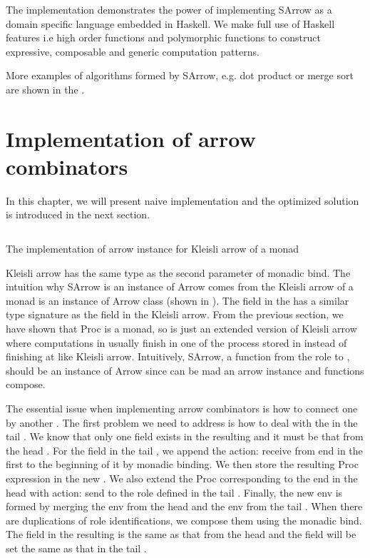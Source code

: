 The implementation demonstrates the power of implementing SArrow as a domain specific language embedded in Haskell. We make full use of Haskell features i.e high order functions and polymorphic functions to construct expressive, composable and \linebreak generic computation patterns.

More examples of algorithms formed by SArrow, e.g. dot product or merge sort are shown in the .
\section{Implementation of arrow combinators} \label{SArrow:impl}
In this chapter, we will present naive implementation and the optimized solution is introduced in the next section.

\begin{listing}[ht]
    \inputminted{Haskell}{arrow/kleisli.hs} 
    \caption{The implementation of arrow instance for Kleisli arrow of a monad}
    \label{arrow:code:kleisli}
\end{listing}

Kleisli arrow has the same type as the second parameter of monadic bind. The intuition why SArrow is an instance of Arrow comes from the Kleisli arrow of a monad is an instance of Arrow class (shown in ). The  field in the  has a similar type signature as the  field in the Kleisli arrow. From the previous section, we have shown that Proc is a monad, so  is just an extended version of Kleisli arrow where computations in  usually finish in one of the process stored in  instead of finishing at  like Kleisli arrow. Intuitively, SArrow, a function from the role to , should be an instance of Arrow since  can be mad an arrow instance and functions compose.

The essential issue when implementing arrow combinators is how to connect one  by another . The first problem we need to address is how to deal with the  in the tail . We know that only one  field exists in the resulting  and it must be that from the head . For the  field in the tail , we append the action: receive from end in the first  to the beginning of it by monadic binding. We then store the resulting Proc expression in the new . We also extend the Proc corresponding to the end in the head  with action: send to the  role defined in the tail . Finally, the new env is formed by merging the env from the head  and the env from the tail . When there are duplications of role identifications, we compose them using the monadic bind. The  field in the resulting  is the same as that from the head  and the  field will be set the same as that in the tail .

